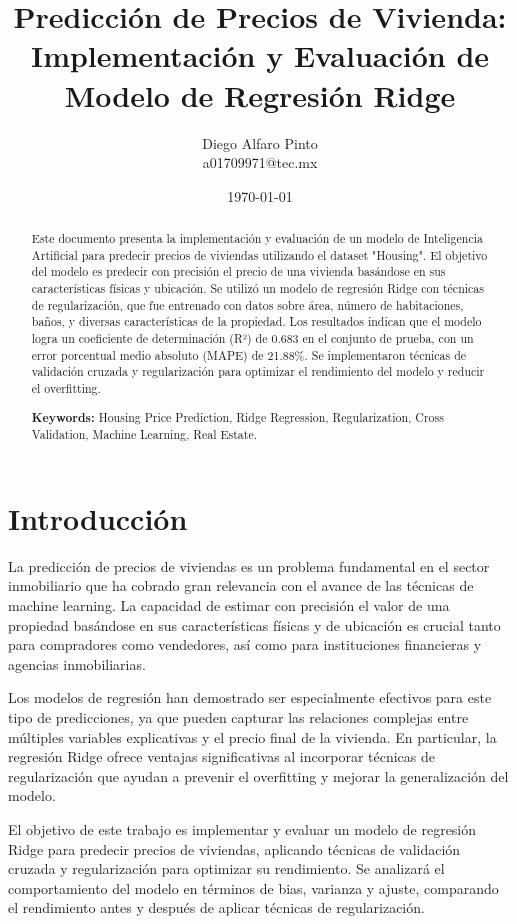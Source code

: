 \documentclass[11pt,a4paper]{article}
\title{Predicción de Precios de Vivienda: Implementación y Evaluación de Modelo de Regresión Ridge}
\author{Diego Alfaro Pinto\\ a01709971@tec.mx}
\date{\today}
\begin{document}
\maketitle

\begin{abstract}
Este documento presenta la implementación y evaluación de un modelo de Inteligencia Artificial para predecir precios de viviendas utilizando el dataset "Housing". El objetivo del modelo es predecir con precisión el precio de una vivienda basándose en sus características físicas y ubicación. Se utilizó un modelo de regresión Ridge con técnicas de regularización, que fue entrenado con datos sobre área, número de habitaciones, baños, y diversas características de la propiedad. Los resultados indican que el modelo logra un coeficiente de determinación (R²) de 0.683 en el conjunto de prueba, con un error porcentual medio absoluto (MAPE) de 21.88\%. Se implementaron técnicas de validación cruzada y regularización para optimizar el rendimiento del modelo y reducir el overfitting.

\textbf{Keywords:} Housing Price Prediction, Ridge Regression, Regularization, Cross Validation, Machine Learning, Real Estate.
\end{abstract}

\section{Introducción}

La predicción de precios de viviendas es un problema fundamental en el sector inmobiliario que ha cobrado gran relevancia con el avance de las técnicas de machine learning. La capacidad de estimar con precisión el valor de una propiedad basándose en sus características físicas y de ubicación es crucial tanto para compradores como vendedores, así como para instituciones financieras y agencias inmobiliarias.

Los modelos de regresión han demostrado ser especialmente efectivos para este tipo de predicciones, ya que pueden capturar las relaciones complejas entre múltiples variables explicativas y el precio final de la vivienda. En particular, la regresión Ridge ofrece ventajas significativas al incorporar técnicas de regularización que ayudan a prevenir el overfitting y mejorar la generalización del modelo.

El objetivo de este trabajo es implementar y evaluar un modelo de regresión Ridge para predecir precios de viviendas, aplicando técnicas de validación cruzada y regularización para optimizar su rendimiento. Se analizará el comportamiento del modelo en términos de bias, varianza y ajuste, comparando el rendimiento antes y después de aplicar técnicas de regularización.
\end{document}
